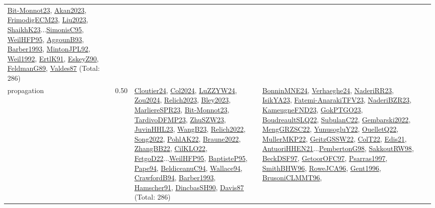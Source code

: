 {\begin{longtable}{p{3cm}r>{\raggedright\arraybackslash}p{6cm}>{\raggedright\arraybackslash}p{6cm}>{\raggedright\arraybackslash}p{8cm}}
\hyperref[detail:Bit-Monnot23]{Bit-Monnot23}, \hyperref[detail:Akan2023]{Akan2023}, \hyperref[detail:FrimodigECM23]{FrimodigECM23}, \hyperref[detail:Liu2023]{Liu2023}, \hyperref[detail:ShaikhK23]{ShaikhK23}...\hyperref[detail:SimonisC95]{SimonisC95}, \hyperref[detail:WeilHFP95]{WeilHFP95}, \hyperref[detail:AggounB93]{AggounB93}, \hyperref[detail:Barber1993]{Barber1993}, \hyperref[detail:MintonJPL92]{MintonJPL92}, \hyperref[detail:Weil1992]{Weil1992}, \hyperref[detail:ErtlK91]{ErtlK91}, \hyperref[detail:EskeyZ90]{EskeyZ90}, \hyperref[detail:FeldmanG89]{FeldmanG89}, \hyperref[detail:Valdes87]{Valdes87} (Total: 286)\\
\index{propagation}\index{CP!propagation}propagation &  0.50 & \hyperref[detail:Cloutier24]{Cloutier24}, \hyperref[detail:Col2024]{Col2024}, \hyperref[detail:LuZZYW24]{LuZZYW24}, \hyperref[detail:Zou2024]{Zou2024}, \hyperref[detail:Relich2023]{Relich2023}, \hyperref[detail:Bley2023]{Bley2023}, \hyperref[detail:MarliereSPR23]{MarliereSPR23}, \hyperref[detail:Bit-Monnot23]{Bit-Monnot23}, \hyperref[detail:TardivoDFMP23]{TardivoDFMP23}, \hyperref[detail:ZhuSZW23]{ZhuSZW23}, \hyperref[detail:JuvinHHL23]{JuvinHHL23}, \hyperref[detail:WangB23]{WangB23}, \hyperref[detail:Relich2022]{Relich2022}, \hyperref[detail:Song2022]{Song2022}, \hyperref[detail:PohlAK22]{PohlAK22}, \hyperref[detail:Braune2022]{Braune2022}, \hyperref[detail:ZhangBB22]{ZhangBB22}, \hyperref[detail:CilKLO22]{CilKLO22}, \hyperref[detail:FetgoD22]{FetgoD22}...\hyperref[detail:WeilHFP95]{WeilHFP95}, \hyperref[detail:BaptisteP95]{BaptisteP95}, \hyperref[detail:Pape94]{Pape94}, \hyperref[detail:BeldiceanuC94]{BeldiceanuC94}, \hyperref[detail:Wallace94]{Wallace94}, \hyperref[detail:CrawfordB94]{CrawfordB94}, \hyperref[detail:Barber1993]{Barber1993}, \hyperref[detail:Hamscher91]{Hamscher91}, \hyperref[detail:DincbasSH90]{DincbasSH90}, \hyperref[detail:Davis87]{Davis87} (Total: 286) & \hyperref[detail:BonninMNE24]{BonninMNE24}, \hyperref[detail:Verhaeghe24]{Verhaeghe24}, \hyperref[detail:NaderiRR23]{NaderiRR23}, \hyperref[detail:IsikYA23]{IsikYA23}, \hyperref[detail:Fatemi-AnarakiTFV23]{Fatemi-AnarakiTFV23}, \hyperref[detail:NaderiBZR23]{NaderiBZR23}, \hyperref[detail:KameugneFND23]{KameugneFND23}, \hyperref[detail:GokPTGO23]{GokPTGO23}, \hyperref[detail:BoudreaultSLQ22]{BoudreaultSLQ22}, \hyperref[detail:SubulanC22]{SubulanC22}, \hyperref[detail:Gembarski2022]{Gembarski2022}, \hyperref[detail:MengGRZSC22]{MengGRZSC22}, \hyperref[detail:YunusogluY22]{YunusogluY22}, \hyperref[detail:OuelletQ22]{OuelletQ22}, \hyperref[detail:MullerMKP22]{MullerMKP22}, \hyperref[detail:GeitzGSSW22]{GeitzGSSW22}, \hyperref[detail:ColT22]{ColT22}, \hyperref[detail:Edis21]{Edis21}, \hyperref[detail:AntuoriHHEN21]{AntuoriHHEN21}...\hyperref[detail:PembertonG98]{PembertonG98}, \hyperref[detail:SakkoutRW98]{SakkoutRW98}, \hyperref[detail:BeckDSF97]{BeckDSF97}, \hyperref[detail:GetoorOFC97]{GetoorOFC97}, \hyperref[detail:Psarras1997]{Psarras1997}, \hyperref[detail:SmithBHW96]{SmithBHW96}, \hyperref[detail:RoweJCA96]{RoweJCA96}, \hyperref[detail:Gent1996]{Gent1996}, \hyperref[detail:BrusoniCLMMT96]{BrusoniCLMMT96}, 
\end{longtable}}
